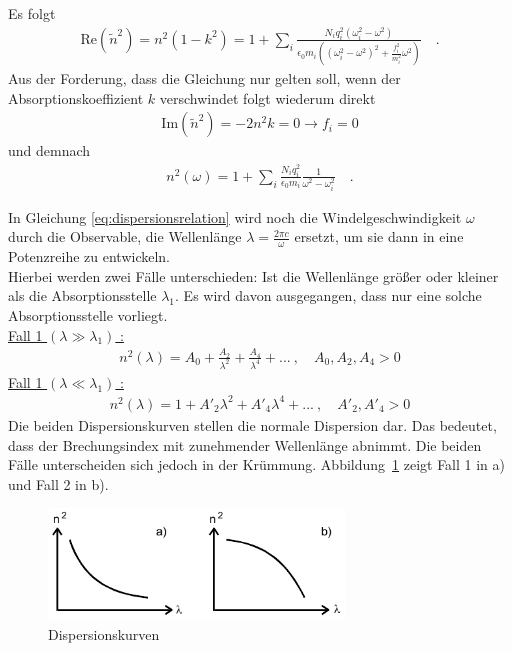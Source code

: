 Es folgt
\begin{align}\label{Absorptionsstelle}
\text{Re}\left( \tilde{n}^2 \right) = n^2(1-k^2) = 1 + \sum_{i} \frac{N_i q_i ^2 (\omega_i^2 - \omega^2)}{\epsilon_0 m_i \left((\omega_i^2 - \omega^2)^2 + \frac{f_i^2}{m_i^2} \omega^2 \right)}  \quad.
\end{align}
Aus der Forderung, dass die Gleichung nur gelten soll, wenn der Absorptionskoeffizient $k$ verschwindet folgt wiederum direkt
\begin{align}
\text{Im}\left( \tilde{n}^2 \right) = -2 n^2 k = 0 \rightarrow f_i = 0
\end{align}
und demnach
\begin{align} \label{eq:dispersionsrelation}
n^2(\omega) = 1 + \sum_{i} \frac{N_i q_i^2}{\epsilon_0 m_i} \frac{1}{\omega^2 - \omega_i^2}  \quad.
\end{align}
\clearpage

In Gleichung \eqref{eq:dispersionsrelation} wird noch die Windelgeschwindigkeit $\omega$ durch die Observable, die Wellenlänge $\lambda  = \frac{2 \pi c}{\omega}$ ersetzt, um sie dann in eine Potenzreihe zu entwickeln. \\
Hierbei werden zwei Fälle unterschieden: Ist die Wellenlänge größer oder kleiner als die Absorptionsstelle $\lambda_1$. Es wird davon ausgegangen, dass nur eine solche Absorptionsstelle vorliegt. \\
\underline{Fall 1 $(\lambda \gg \lambda_1)$ :}  \\
\begin{align}\label{Fall1}
n^2(\lambda) = A_0 + \frac{A_2}{\lambda^2} + \frac{A_4}{\lambda^4} + ... \ , \quad A_0, A_2, A_4 > 0
\end{align}
\underline{Fall 1 $(\lambda \ll \lambda_1)$ :}  \\
\begin{align}\label{Fall2}
n^2(\lambda) = 1 + A'_2 \lambda^2 + A'_4 \lambda^4 + ... \ , \quad A'_2, A'_4 > 0
\end{align}
Die beiden Dispersionskurven stellen die normale Dispersion dar. Das bedeutet, dass der Brechungsindex mit zunehmender Wellenlänge abnimmt. Die beiden Fälle unterscheiden sich jedoch in der Krümmung. Abbildung~\ref{fig:dispersionskurven} zeigt Fall 1 in a) und Fall 2 in b).

\begin{figure}[h!]
	\centering
	\includegraphics[width=0.7\textwidth]{Theorie.png}
	\caption[Dispersionkurven]{Dispersionskurven \cite{V402}}
	\label{fig:dispersionskurven}
\end{figure}